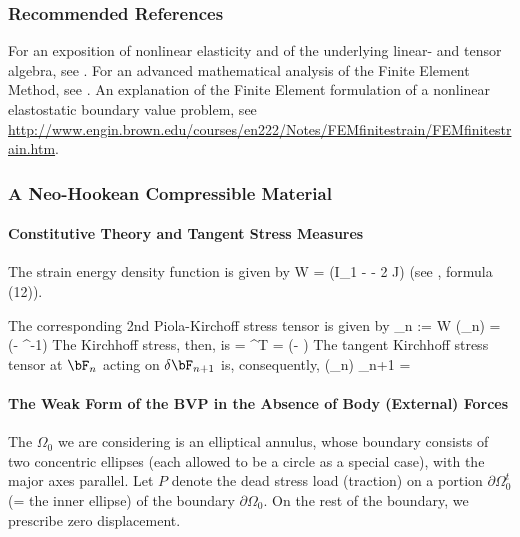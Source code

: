 \documentclass[a4paper,twoside,12pt]{book}
\begin{document}
\subsubsection*{Recommended References}

For an exposition of nonlinear elasticity and of the underlying
linear- and tensor algebra, see \cite{Ogden}.  For an advanced
mathematical analysis of the Finite Element Method, see
\cite{Raviart-Thomas}.  An explanation of the Finite Element
formulation of a nonlinear elastostatic boundary value problem, see
{\small \url{http://www.engin.brown.edu/courses/en222/Notes/FEMfinitestrain/FEMfinitestrain.htm}}.

\subsubsection{A Neo-Hookean Compressible Material}

\paragraph{Constitutive Theory and Tangent Stress Measures}

The strain energy density function is given by
\eqn
W = {\mu {}}(I_1 - \tr \Id - 2 \ln J)
\nqe
(see \cite{Horgan-Saccomandi}, formula (12)).

The corresponding 2nd Piola-Kirchoff stress tensor is given by
\eqn
\bS_{n} := {\PD{} W \over \PD{}\bE} (\bF_{n})
=
\mu (\Id - \bC^{-1})
\nqe
The Kirchhoff stress, then, is
\eqn
\kappa
= \bF \bS \bF^{T}
= \mu (\bB  - \Id)
\nqe
The tangent Kirchhoff stress tensor at $\bF_{n}$ acting on
$
\delta \bF_{n+1}
$ is, consequently,
\eqn
{\PD{} \kappa \over \PD{} \bF} (\bF_{n}) \delta \bF_{n+1}
=
\mu
{}
\nqe

\paragraph{The Weak Form of the BVP in the Absence of Body (External) Forces}

The $\Omega_0$ we are considering is an elliptical annulus, whose
boundary consists of two concentric ellipses (each allowed to be a
circle as a special case), with the major axes parallel.  Let $P$ denote the dead stress load (traction) on a portion
$\partial \Omega_0^{t}$ (= the inner ellipse) of the boundary
$\partial \Omega_0$.  On the rest of the boundary, we prescribe zero displacement.
\end{document}
